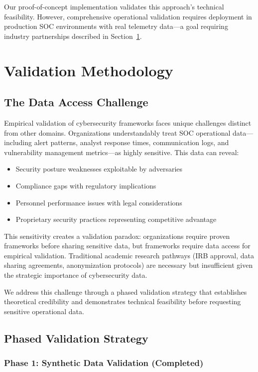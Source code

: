 \documentclass[11pt, a4paper]{article}
\begin{document}
Our proof-of-concept implementation validates this approach's technical feasibility\cite{canale2024slm}. However, comprehensive operational validation requires deployment in production SOC environments with real telemetry data—a goal requiring industry partnerships described in Section~\ref{sec:validation}.

\section{Validation Methodology}
\label{sec:validation}

\subsection{The Data Access Challenge}

Empirical validation of cybersecurity frameworks faces unique challenges distinct from other domains. Organizations understandably treat SOC operational data—including alert patterns, analyst response times, communication logs, and vulnerability management metrics—as highly sensitive. This data can reveal:
\begin{itemize}
\item Security posture weaknesses exploitable by adversaries
\item Compliance gaps with regulatory implications
\item Personnel performance issues with legal considerations
\item Proprietary security practices representing competitive advantage
\end{itemize}

This sensitivity creates a validation paradox: organizations require proven frameworks before sharing sensitive data, but frameworks require data access for empirical validation. Traditional academic research pathways (IRB approval, data sharing agreements, anonymization protocols) are necessary but insufficient given the strategic importance of cybersecurity data.

We address this challenge through a phased validation strategy that establishes theoretical credibility and demonstrates technical feasibility before requesting sensitive operational data.

\subsection{Phased Validation Strategy}

\subsubsection{Phase 1: Synthetic Data Validation (Completed)}
\end{document}
